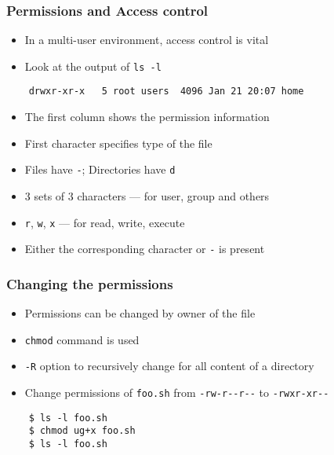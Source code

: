 \documentclass[12pt,compress]{beamer}
\begin{document}
\begin{frame}[fragile]
  \frametitle{Permissions and Access control}

  \begin{itemize}
  \item In a multi-user environment, access control is vital
  \item Look at the output of \texttt{ls -l}
  \end{itemize}

  \begin{lstlisting}
    drwxr-xr-x   5 root users  4096 Jan 21 20:07 home
  \end{lstlisting} %

  \begin{itemize}
  \item The first column shows the permission information
  \item First character specifies type of the file
  \item Files have \texttt{-}; Directories have \texttt{d}
  \item 3 sets of 3 characters --- for user, group and others
  \item \texttt{r}, \texttt{w}, \texttt{x} --- for read, write, execute
  \item Either the corresponding character or \texttt{-} is present
  \end{itemize}
\end{frame}

\begin{frame}[fragile]
  \frametitle{Changing the permissions}
  \begin{itemize}
  \item Permissions can be changed by owner of the file
  \item \texttt{chmod} command is used
  \item \texttt{-R} option to recursively change for all content of a
    directory
  \end{itemize}
  \begin{itemize}
  \item Change permissions of \texttt{foo.sh} from
    \texttt{-rw-r-{}-r-{}-} to \texttt{-rwxr-xr-{}-}
  \end{itemize}
  \begin{lstlisting}
    $ ls -l foo.sh
    $ chmod ug+x foo.sh
    $ ls -l foo.sh
  \end{lstlisting} %
\end{frame}
\end{document}
